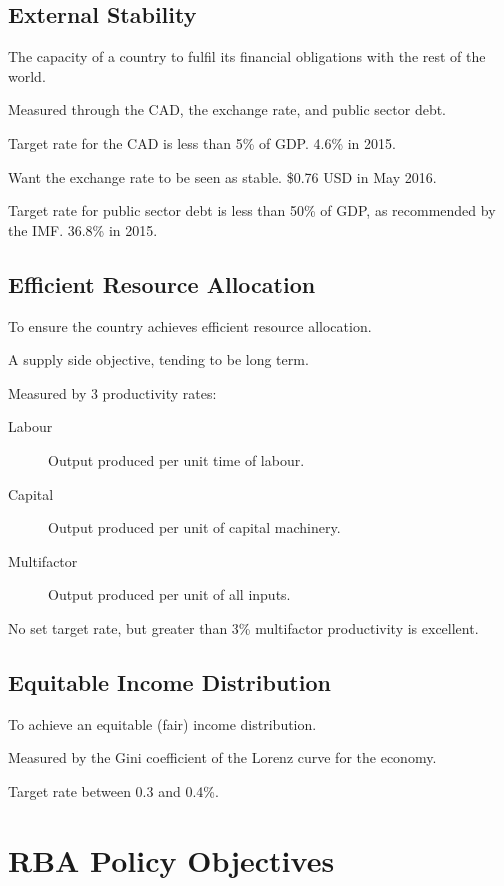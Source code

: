\documentclass[a4paper,11pt]{article}
\begin{document}
\subsection{External Stability}

The capacity of a country to fulfil its financial obligations with the rest of
the world.

Measured through the CAD, the exchange rate, and public sector debt.

Target rate for the CAD is less than 5\% of GDP. 4.6\% in 2015.

Want the exchange rate to be seen as stable. \$0.76 USD in May 2016.

Target rate for public sector debt is less than 50\% of GDP, as recommended by
the IMF. 36.8\% in 2015.


\subsection{Efficient Resource Allocation}

To ensure the country achieves efficient resource allocation.

A supply side objective, tending to be long term.

Measured by 3 productivity rates:

\begin{description}
\item [Labour] Output produced per unit time of labour.
\item [Capital] Output produced per unit of capital machinery.
\item [Multifactor] Output produced per unit of all inputs.
\end{description}

No set target rate, but greater than 3\% multifactor productivity is excellent.


\subsection{Equitable Income Distribution}

To achieve an equitable (fair) income distribution.

Measured by the Gini coefficient of the Lorenz curve for the economy.

Target rate between 0.3 and 0.4\%.




\section{RBA Policy Objectives}
\end{document}
